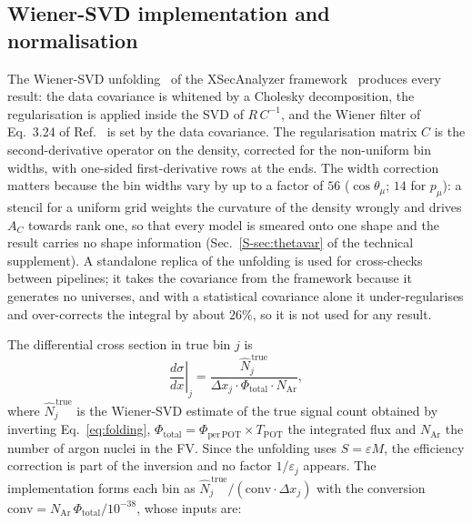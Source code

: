 \documentclass[11pt,a4paper]{article}
\newcommand{\suppref}[2]{#1~\ref{S-#2} of the technical supplement}
\begin{document}
\subsection{Wiener-SVD implementation and normalisation}

The Wiener-SVD unfolding~\cite{wienervsd} of the XSecAnalyzer framework~\cite{xsec_analyzer,uboone_tki}
produces every result: the data covariance is whitened by a Cholesky decomposition, the
regularisation is applied inside the SVD of $R\,C^{-1}$, and the Wiener filter of Eq.~3.24 of
Ref.~\cite{wienervsd} is set by the data covariance. The regularisation matrix $C$ is the
second-derivative operator on the density, corrected for the non-uniform bin widths, with one-sided
first-derivative rows at the ends. The width correction matters because the bin widths vary by up
to a factor of $56$ ($\cos\theta_\mu$; $14$ for $p_\mu$): a stencil for a
uniform grid weights the curvature of the density wrongly and drives $A_C$ towards rank one, so that
every model is smeared onto one shape and the result carries no shape information
(\suppref{Sec.}{sec:thetavar}). A standalone replica of the unfolding is used for cross-checks
between pipelines; it takes the covariance from the framework because it generates no universes,
and with a statistical covariance alone it under-regularises and over-corrects the integral by
about $26\%$, so it is not used for any result.

The differential cross section in true bin $j$ is
\begin{equation}
  \left.\frac{d\sigma}{dx}\right|_j
  = \frac{\hat{N}_j^{\,\mathrm{true}}}
         {\Delta x_j \cdot \Phi_{\mathrm{total}} \cdot N_{\mathrm{Ar}}},
  \label{eq:xsec_def}
\end{equation}
where $\hat{N}_j^{\,\mathrm{true}}$ is the Wiener-SVD estimate of the true signal count obtained by
inverting Eq.~\eqref{eq:folding}, $\Phi_{\mathrm{total}} = \Phi_{\mathrm{per\,POT}} \times
T_{\mathrm{POT}}$ the integrated flux and $N_{\mathrm{Ar}}$ the number of argon nuclei in the FV.
Since the unfolding uses $S=\varepsilon M$, the efficiency correction is part of the inversion and
no factor $1/\varepsilon_j$ appears. The implementation forms each bin as
$\hat N_j^{\,\mathrm{true}}/(\mathrm{conv}\cdot\Delta x_j)$ with the conversion
$\mathrm{conv} = N_{\mathrm{Ar}}\,\Phi_{\mathrm{total}}/10^{-38}$, whose inputs are:
\end{document}
